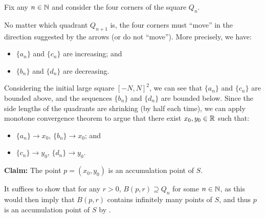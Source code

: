 \begin{enumerate}
\begin{pf}
\begin{pf}
Fix any \(n\in\mathbb{N}\) and consider the four corners of the square \(Q_n\).
\begin{center}
\end{center}
No matter which quadrant \(Q_{n+1}\) is, the four corners must ``move'' in the
direction suggested by the  arrows (or do not ``move''). More
precisely, we have:
\begin{itemize}
\item \(\{a_n\}\) and \(\{c_n\}\) are increasing; and
\item \(\{b_n\}\) and \(\{d_n\}\) are decreasing.
\end{itemize}
Considering the initial large square \([-N,N]^{2}\), we can see that
\(\{a_n\}\) and \(\{c_n\}\) are bounded above, and the sequences \(\{b_n\}\)
and \(\{d_n\}\) are bounded below. Since the side lengths of the quadrants are
shrinking (by half each time), we can apply monotone convergence theorem to
argue that there exist \(x_0,y_0\in\mathbb{R}\) such that: 
\begin{itemize}
\item \(\{a_n\}\to x_0\), \(\{b_n\}\to x_0\); and
\item \(\{c_n\}\to y_0\), \(\{d_n\}\to y_0\).
\end{itemize}
\end{pf}

\textbf{Claim:} The point \(p=(x_0,y_0)\) is an accumulation point of \(S\).

\begin{pf}
It suffices to show that for any \(r>0\), \(B(p,r)\supseteq Q_n\) for some
\(n\in\mathbb{N}\), as this would then imply that \(B(p,r)\) contains infinitely many
points of \(S\), and thus \(p\) is an accumulation point of \(S\) by .


\end{pf}
\end{pf}
\end{enumerate}
